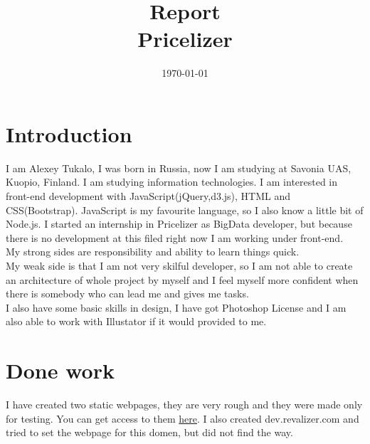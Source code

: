 \documentclass[english]{article}
\date{}
\begin{document}
\title{\vspace{3in}Report\\
\small Pricelizer\\
}

\nopagebreak
\maketitle


\vspace{4in}



\date{\today}
\thispagestyle{empty}

\newpage
\setcounter{page}{1}
\setcounter{tocdepth}{2}

\newpage


\section{Introduction}
I am Alexey Tukalo, I was born in Russia, now I am studying at Savonia UAS, Kuopio, Finland. I am studying information technologies. I am interested in front-end development with JavaScript(jQuery,d3.js), HTML and CSS(Bootstrap). JavaScript is my favourite language, so I also know a little bit of Node.js. I started an internship in Pricelizer as BigData developer, but because there is no development at this filed right now I am working under front-end.\\

My strong sides are responsibility and ability to learn things quick.\\

My weak side is that I am not very skilful developer, so I am not able to create an architecture of whole project by myself and I feel myself more confident when there is somebody who can lead me and gives me tasks.\\

I also have some basic skills in design, I have got Photoshop License and I am also able to work with Illustator if it would provided to me.

\section{Done work}

I have created two static webpages, they are very rough and they were made only for testing. You can get access to them \href{https://drive.google.com/drive/folders/0B31OvwH-VznzWEhQaS1kZ1czY2M/0B71tfQ9yZsMGfktUX3hBYk1hMGZJS1ZyLTBjUERxNHdOajEyakJVVjc2TEtHbFUwVjZucGs}{here}. I also created dev.revalizer.com and tried to set the webpage for this domen, but did not find the way.
\end{document}
